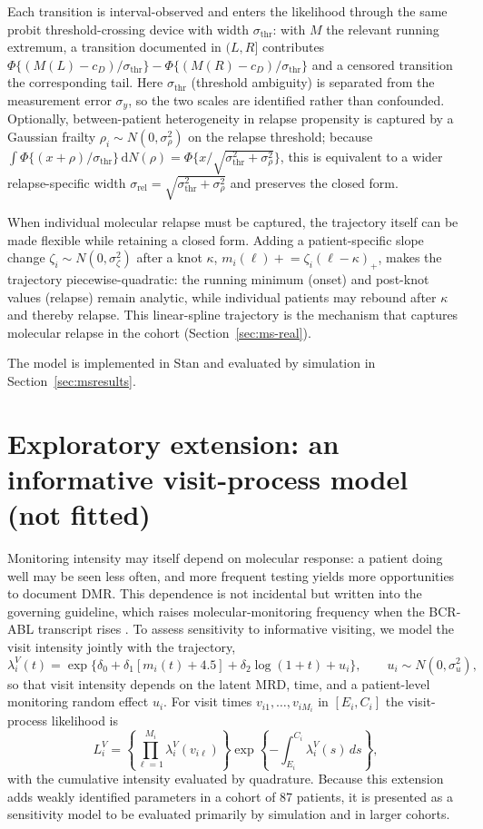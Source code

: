 \documentclass[11pt]{article}
\begin{document}
Each transition is interval-observed and enters the likelihood through the same
probit threshold-crossing device with width $\sigma_{\mathrm{thr}}$: with $M$
the relevant running extremum, a transition documented in $(L,R]$ contributes
$\Phi\{(M(L)-c_D)/\sigma_{\mathrm{thr}}\}-\Phi\{(M(R)-c_D)/\sigma_{\mathrm{thr}}\}$
and a censored transition the corresponding tail. Here $\sigma_{\mathrm{thr}}$
(threshold ambiguity) is separated from the measurement error $\sigma_y$, so the
two scales are identified rather than confounded. Optionally, between-patient
heterogeneity in relapse propensity is captured by a Gaussian frailty
$\rho_i\sim N(0,\sigma_\rho^2)$ on the relapse threshold; because
$\int\Phi\{(x+\rho)/\sigma_{\mathrm{thr}}\}\,\mathrm{d}N(\rho)=
\Phi\{x/\sqrt{\sigma_{\mathrm{thr}}^2+\sigma_\rho^2}\}$, this is equivalent to a
wider relapse-specific width $\sigma_{\mathrm{rel}}=\sqrt{\sigma_{\mathrm{thr}}^2+\sigma_\rho^2}$ and preserves the closed form.

When individual molecular relapse must be captured, the trajectory itself can
be made flexible while retaining a closed form. Adding a patient-specific slope
change $\zeta_i\sim N(0,\sigma_\zeta^2)$ after a knot $\kappa$,
$m_i(\ell)\mathrel{+}{=}\zeta_i(\ell-\kappa)_+$, makes the trajectory
piecewise-quadratic: the running minimum (onset) and post-knot values (relapse)
remain analytic, while individual patients may rebound after $\kappa$ and thereby
relapse. This linear-spline trajectory is the mechanism that captures molecular
relapse in the cohort (Section~\ref{sec:ms-real}).

The model is implemented in
Stan and evaluated by simulation in Section~\ref{sec:msresults}.



\section{Exploratory extension: an informative visit-process model (not fitted)}
\label{sec:visit}

Monitoring intensity may itself depend on molecular response: a patient
doing well may be seen less often, and more frequent testing yields more
opportunities to document DMR. This dependence is not incidental but written
into the governing guideline, which raises molecular-monitoring frequency when
the BCR-ABL transcript rises \cite{CSH2011CMLGuideline}. To assess sensitivity to informative
visiting, we model the visit intensity jointly with the trajectory,
\[
\lambda_i^V(t)=
\exp\{\delta_0+\delta_1[m_i(t)+4.5]+\delta_2\log(1+t)+u_i\},
\qquad u_i\sim N(0,\sigma_u^2),
\]
so that visit intensity depends on the latent MRD, time, and a
patient-level monitoring random effect $u_i$. For visit times
$v_{i1},\ldots,v_{iM_i}$ in $[E_i,C_i]$ the visit-process likelihood is
\[
L_i^V=
\left\{\prod_{\ell=1}^{M_i}\lambda_i^V(v_{i\ell})\right\}
\exp\left\{-\int_{E_i}^{C_i}\lambda_i^V(s)\,ds\right\},
\]
with the cumulative intensity evaluated by quadrature. Because this
extension adds weakly identified parameters in a cohort of 87 patients, it
is presented as a sensitivity model to be evaluated primarily by
simulation and in larger cohorts.
\end{document}
